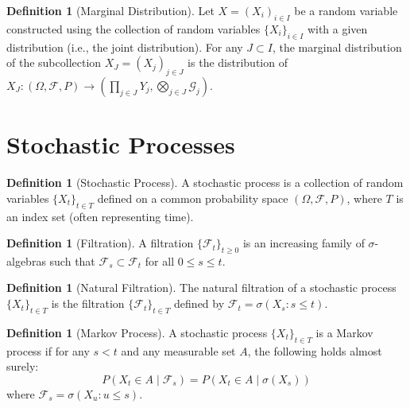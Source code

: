 \documentclass[11pt]{amsart}
\theoremstyle{plain}
\theoremstyle{definition}
\newtheorem{definition}[theorem]{Definition}
\theoremstyle{remark}
\numberwithin{equation}{section}
\begin{document}
{

\begin{definition}[Marginal Distribution]
Let $X = (X_i)_{i \in I}$ be a random variable constructed using the collection of random variables $\{X_i\}_{i \in I}$ with a given distribution (i.e., the joint distribution). For any $J \subset I$, the marginal distribution of the subcollection $X_J = (X_j)_{j \in J}$ is the distribution of $X_J: (\Omega, \mathcal{F}, P) \to (\prod_{j \in J} Y_j, \bigotimes_{j \in J} \mathcal{G}_j)$.
\end{definition}


\section{Stochastic Processes}
\label{app:B}
\begin{definition}[Stochastic Process]
    A stochastic process is a collection of random variables $\{X_t\}_{t \in T}$ defined on a common probability space $(\Omega, \mathcal{F}, P)$, where $T$ is an index set (often representing time).
\end{definition}

\begin{definition}[Filtration]
A filtration $\{\mathcal{F}_t\}_{t \geq 0}$ is an increasing family of $\sigma$-algebras such that $\mathcal{F}_s \subset \mathcal{F}_t$ for all $0 \leq s \leq t$.
\end{definition}

\begin{definition}[Natural Filtration]
    The natural filtration of a stochastic process $\{X_t\}_{t \in T}$ is the filtration $\{\mathcal{F}_t\}_{t \in T}$ defined by $\mathcal{F}_t = \sigma(X_s : s \leq t)$.
\end{definition}    

\begin{definition}[Markov Process]
    A stochastic process $\{X_t\}_{t \in T}$ is a Markov process if for any $s<t$ and any measurable set $A$, the following holds almost surely:
    \[
    P(X_{t} \in A \mid \mathcal{F}_s) = P(X_{t} \in A \mid \sigma(X_{s}))
    \]
    where $\mathcal{F}_s = \sigma(X_u : u \leq s)$.
\end{definition}

}
\end{document}
